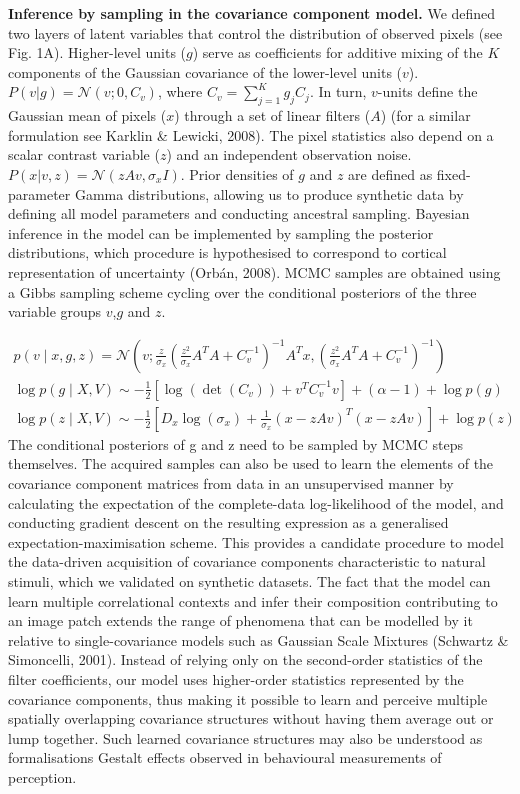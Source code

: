 \documentclass[12pt,a4paper]{article}
\begin{document}
\vspace{5mm}

{\bf Inference by sampling in the covariance component model.} We defined two layers of latent variables that control the distribution of observed pixels (see Fig. 1A). Higher-level units ($g$) serve as coefficients for additive mixing of the $K$ components of the Gaussian covariance of the lower-level units ($v$). $P(v | g) = \mathcal{N}(v;0,C_v)$, where $C_v = \sum_{j=1}^K g_jC_j$. In turn, $v$-units define the Gaussian mean of pixels ($x$) through a set of linear filters ($A$) (for a similar formulation see Karklin \& Lewicki, 2008). The pixel statistics also depend on a scalar contrast variable ($z$) and an independent observation noise. $P(x|v,z) = \mathcal{N}(zAv,\sigma_x I)$. Prior densities of $g$ and $z$ are defined as fixed-parameter Gamma distributions, allowing us to produce synthetic data by defining all model parameters and conducting ancestral sampling. Bayesian inference in the model can be implemented by sampling the posterior distributions, which procedure is hypothesised to correspond to cortical representation of uncertainty (Orb\'an, 2008). MCMC samples are obtained using a Gibbs sampling scheme cycling over the conditional posteriors of the three variable groups $v$,$g$ and $z$. 

\begin{eqnarray}
p(v \mid x,g,z) = \mathcal{N}\left(v; \frac{z}{ \sigma_x} \left( \frac{z^2}{ \sigma_x} A^T A + C_v^{-1}\right)^{-1} A^T x, \left(\frac{z^2}{\sigma_x} A^T A + C_v^{-1}\right)^{-1}\right) \\
\log p(g \mid X,V) \sim -\frac{1}{2} \left[\log(\det(C_v)) + v^T C_v^{-1} v \right] + (\alpha-1) + \log p(g) \\
\log p(z \mid X,V) \sim -\frac{1}{2} \left[ D_x\log(\sigma_x) + \frac{1}{\sigma_x}  (x - zAv)^T (x - zAv)\right] + \log p(z)
\end{eqnarray}
%
The conditional posteriors of g and z need to be sampled by MCMC steps themselves. The acquired samples can also be used to learn the elements of the covariance component matrices from data in an unsupervised manner by calculating the expectation of the complete-data log-likelihood of the model, and conducting gradient descent on the resulting expression as a generalised expectation-maximisation scheme. This provides a candidate procedure to model the data-driven acquisition of covariance components characteristic to natural stimuli, which we validated on synthetic datasets. The fact that the model can learn multiple correlational contexts and infer their composition contributing to an image patch extends the range of phenomena that can be modelled by it relative to single-covariance models such as Gaussian Scale Mixtures (Schwartz \& Simoncelli, 2001). Instead of relying only on the second-order statistics of the filter coefficients, our model uses higher-order statistics represented by the covariance components, thus making it possible to learn and perceive multiple spatially overlapping covariance structures without having them average out or lump together. Such learned covariance structures may also be understood as formalisations Gestalt effects observed in behavioural measurements of perception.
\end{document}
